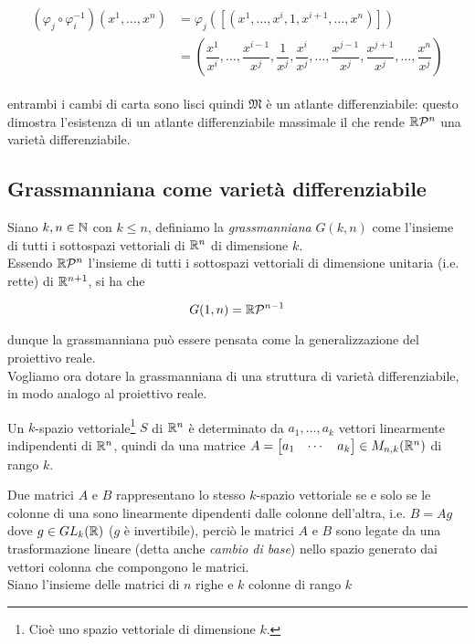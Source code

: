\begin{align}
	\begin{split}
		(\varphi_{j} \circ \varphi_{i}^{-1})(x^{1},\dots,x^{n}) &= \varphi_{j}([(x^{1},\dots,x^{i},1,x^{i+1},\dots,x^{n})]) \\
		&= \left( \dfrac{x^{1}}{x^{i}}, \dots, \dfrac{x^{i-1}}{x^{j}}, \dfrac{1}{x^{j}}, \dfrac{x^{i}}{x^{j}}, \dots, \dfrac{x^{j-1}}{x^{j}}, \dfrac{x^{j+1}}{x^{j}}, \dots, \dfrac{x^{n}}{x^{j}} \right)
	\end{split}
\end{align}

entrambi i cambi di carta sono lisci quindi $ \mathfrak{M} $ è un atlante differenziabile: questo dimostra l'esistenza di un atlante differenziabile massimale il che rende $ \mathbb{R}\mathcal{P}^{n} $ una varietà differenziabile.

\subsection{Grassmanniana come varietà differenziabile}

Siano $ k,n \in \mathbb{N} $ con $ k \leqslant n $, definiamo la \textit{grassmanniana} $ G(k,n) $ come l'insieme di tutti i sottospazi vettoriali di $ \mathbb{R}^{n} $ di dimensione $ k $. \\
Essendo $ \mathbb{R}\mathcal{P}^{n} $ l'insieme di tutti i sottospazi vettoriali di dimensione unitaria (i.e. rette) di $ \mathbb{R}^{n+1} $, si ha che

\begin{equation}
	G(1,n) = \mathbb{R}\mathcal{P}^{n-1}
\end{equation}

dunque la grassmanniana può essere pensata come la generalizzazione del proiettivo reale. \\
Vogliamo ora dotare la grassmanniana di una struttura di varietà differenziabile, in modo analogo al proiettivo reale.

\begin{remark}
	Un $ k $-spazio vettoriale\footnote{%
		Cioè uno spazio vettoriale di dimensione $ k $.%
	} $ S $ di $ \mathbb{R}^{n} $ è determinato da $ a_{1},\dots,a_{k} $ vettori linearmente indipendenti di $ \mathbb{R}^{n} $, quindi da una matrice $ A = \bmqty{ a_{1} & \cdots & a_{k} } \in M_{n,k}(\R^{n}) $ di rango $ k $.
\end{remark}

Due matrici $ A $ e $ B $ rappresentano lo stesso $ k $-spazio vettoriale se e solo se le colonne di una sono linearmente dipendenti dalle colonne dell'altra, i.e. $ B = A g $ dove $ g \in GL_{k}(\mathbb{R}) $ ($ g $ è invertibile), perciò le matrici $ A $ e $ B $ sono legate da una trasformazione lineare (detta anche \textit{cambio di base}) nello spazio generato dai vettori colonna che compongono le matrici. \\
Siano l'insieme delle matrici di $ n $ righe e $ k $ colonne di rango $ k $

